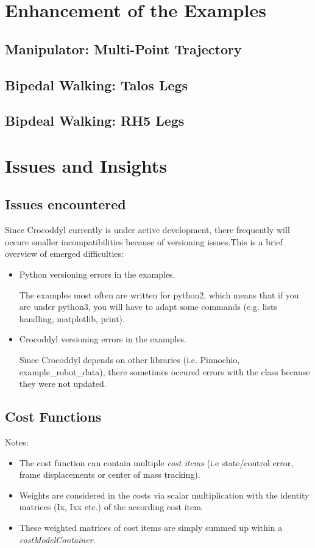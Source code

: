 \section{Enhancement of the Examples}
\subsection{Manipulator: Multi-Point Trajectory}
\subsection{Bipedal Walking: Talos Legs}
\subsection{Bipdeal Walking: RH5 Legs}



\section{Issues and Insights}
\subsection{Issues encountered}
Since Crocoddyl currently is under active development, there frequently will occure smaller incompatibilities because of versioning issues.This is a brief overview of emerged difficulties:
\begin{itemize}
\item Python versioning errors in the examples. 

The examples most often are written for python2, which means that if you are under python3, you will have to adapt some commands (e.g. lists handling, matplotlib, print).
\item Crocoddyl versioning errors in the examples. 

Since Crocoddyl depends on other libraries (i.e. Pinnochio, example\_robot\_data), there sometimes occured errors with the class because they were not updated. 
\end{itemize}

\subsection{Cost Functions}
Notes:
\begin{itemize}
\item The cost function can contain multiple \textit{cost items} (i.e state/control error, frame displacements or center of mass tracking).
\item Weights are considered in the costs via scalar multiplication with the identity matrices (Ix, Ixx etc.) of the according cost item. 
\item These weighted matrices of cost items are simply summed up within a \textit{costModelContainer}.
\end{itemize}

